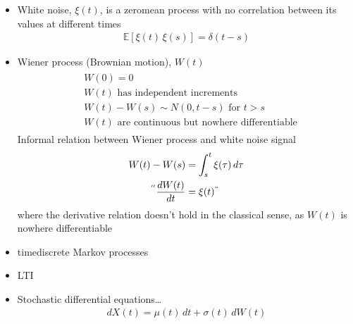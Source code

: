 \documentclass[letterpaper,10pt,english]{jupyterBook}
\begin{document}
\sphinxAtStartPar
{}
\begin{itemize}
\item {} 
\sphinxAtStartPar
White noise, \(\xi(t)\), is a zero\sphinxhyphen{}mean process with no correlation between its values at different times
\begin{equation*}
\begin{split}\mathbb{E}\left[ \xi(t) \, \xi(s) \right] = \delta(t-s)\end{split}
\end{equation*}
\item {} 
\sphinxAtStartPar
Wiener process (Brownian motion), \(W(t)\)
\begin{equation*}
\begin{split}\begin{aligned}
    & W(0) = 0 \\
    & W(t) \text{ has independent increments} \\
    & W(t) - W(s) \sim N(0, t-s) \text{ for $t > s$} \\
    & W(t) \text{ are continuous but nowhere differentiable}
  \end{aligned}\end{split}
\end{equation*}
\sphinxAtStartPar
Informal relation between Wiener process and white noise signal
\begin{equation*}
\begin{split}\begin{aligned}
   W(t) - W(s) & = \int_{s}^{t} \xi(\tau) \, d \tau \\
   {}^{''} \dfrac{d W(t)}{d t} & = \xi(t) {}^{``}
  \end{aligned}\end{split}
\end{equation*}
\sphinxAtStartPar
where the derivative relation doesn’t hold in the classical sense, as \(W(t)\) is nowhere differentiable

\item {} 
\sphinxAtStartPar
time\sphinxhyphen{}discrete Markov processes

\end{itemize}

\sphinxAtStartPar
{}
\begin{itemize}
\item {} 
\sphinxAtStartPar
LTI

\item {} 
\sphinxAtStartPar
Stochastic differential equations…
\begin{equation*}
\begin{split}d X(t) = \mu(t) \, dt + \sigma(t) \, dW(t)\end{split}
\end{equation*}
\end{itemize}
\end{document}
